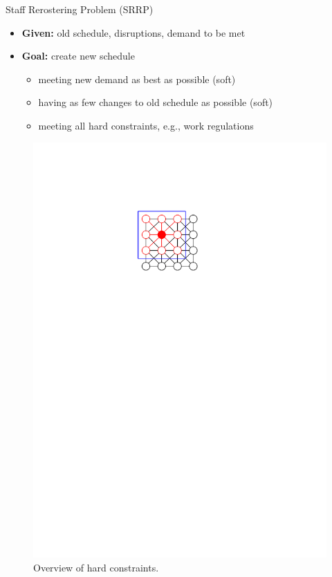 \documentclass[aspectratio=1610]{beamer}
\newcommand{\important}[1]{{\color{green!60!black}#1}}
\begin{document}
\begin{frame}{Staff Rerostering Problem (SRRP)}
	\begin{itemize}
		\item \textbf{Given:} \important{old schedule, disruptions, demand to be met}
		\item \textbf{Goal:} create new schedule
		\begin{itemize}
			\item meeting new \important{demand} as best as possible (soft)
			\item having as few \important{changes} to old schedule as possible (soft)
			\item meeting all hard constraints, e.g., work regulations
		\end{itemize}
	\end{itemize}
	\begin{figure}
		\centering
		\includegraphics[width=\textwidth, page=7]{figures/graphics.pdf}
		\caption{Overview of hard constraints.}
	\end{figure}
\end{frame}
\end{document}
